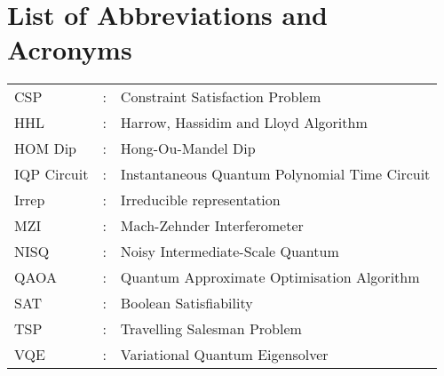 \chapter*{List of Abbreviations and Acronyms}

\begin{tabular}{lcl}
CSP                 &:     & Constraint Satisfaction Problem\\
HHL &: & Harrow, Hassidim and Lloyd Algorithm\\
HOM Dip &: & Hong-Ou-Mandel Dip\\
IQP Circuit &: & Instantaneous Quantum Polynomial Time Circuit\\
Irrep &: & Irreducible representation\\
MZI &: & Mach-Zehnder Interferometer\\
NISQ &: & Noisy Intermediate-Scale Quantum\\
QAOA &: & Quantum Approximate Optimisation Algorithm\\
SAT                 &:     & Boolean Satisfiability\\
TSP                 &:     & Travelling Salesman Problem\\
VQE &: & Variational Quantum Eigensolver\\
\end{tabular}
